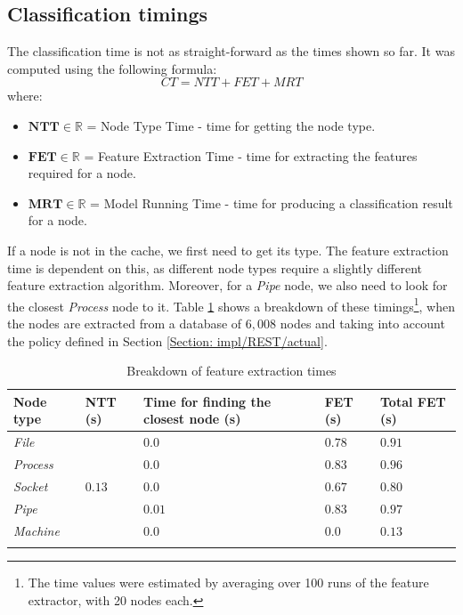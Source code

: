 		\subsection{Classification timings} \label{Section: eval/service-time/classification}
			The classification time is not as straight-forward as the times shown so far. It was computed using the following formula:
			\begin{equation}
				CT = NTT + FET + MRT
			\end{equation}
			where: 
			\begin{itemize}
				\item $\mathbf{NTT} \in \mathbb{R}$ = Node Type Time - time for getting the node type.
				\item $\mathbf{FET} \in \mathbb{R}$ = Feature Extraction Time - time for extracting the features required for a node.
				\item $\mathbf{MRT} \in \mathbb{R}$ = Model Running Time - time for producing a classification result for a node.
			\end{itemize}
			If a node is not in the cache, we first need to get its type. The feature extraction time is dependent on this, as different node types require a slightly different feature extraction algorithm. Moreover, for a \textit{Pipe} node, we also need to look for the closest \textit{Process} node to it. Table \ref{Table: eval/service-time/classification/fet} shows a breakdown of these timings\footnote{The time values were estimated by averaging over 100 runs of the feature extractor, with 20 nodes each.}, when the nodes are extracted from a database of $6,008$ nodes and taking into account the policy defined in Section \ref{Section: impl/REST/actual}.
			\begin{longtable}{|p{} || p{} | p{}| p{}| p{} | }
				\textbf{Node type} & \textbf{NTT} (s) & \textbf{Time for finding the closest node} (s)& \textbf{FET} (s)& \textbf{Total FET} (s)\\
				\hline
				\textit{File} & \multirow{5}{*}{$0.13$}& $0.0$ & $0.78$& $\mathbf{0.91}$ \\
				\hhline{-~---}
				\textit{Process} & & $0.0$ & $0.83$ & $\mathbf{0.96}$\\
				\hhline{-~---}
				\textit{Socket} & & $0.0$ & $0.67$ & $\mathbf{0.80}$ \\
				\hhline{-~---}
				\textit{Pipe} & & $0.01$ & $0.83$ & $\mathbf{0.97}$ \\
				\hhline{-~---}
				\textit{Machine} & & $0.0$ & $0.0$ & $\mathbf{0.13}$\\
				\hline
				\caption{Breakdown of feature extraction times}
				\label{Table: eval/service-time/classification/fet}
			\end{longtable}		
